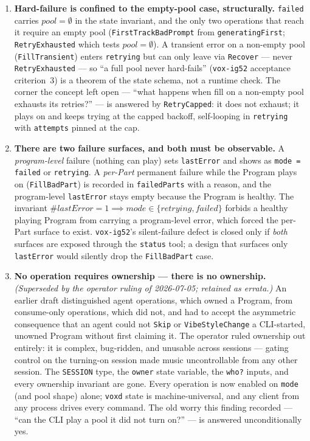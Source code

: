 \documentclass[a4paper,10pt,fleqn]{article}
\begin{document}
\begin{enumerate}
  \item \textbf{Hard-failure is confined to the empty-pool case, structurally.}
    \texttt{failed} carries $pool = \emptyset$ in the state invariant, and the
    only two operations that reach it require an empty pool
    (\texttt{FirstTrackBadPrompt} from \texttt{generatingFirst};
    \texttt{RetryExhausted} which tests $pool = \emptyset$). A transient error
    on a non-empty pool (\texttt{FillTransient}) enters \texttt{retrying} but can
    only leave via \texttt{Recover} --- never \texttt{RetryExhausted} --- so
    ``a full pool never hard-fails'' (\texttt{vox-ig52} acceptance criterion~3)
    is a theorem of the state schema, not a runtime check. The corner the
    concept left open --- ``what happens when fill on a non-empty pool exhausts
    its retries?'' --- is answered by \texttt{RetryCapped}: it does not exhaust;
    it plays on and keeps trying at the capped backoff, self-looping in
    \texttt{retrying} with \texttt{attempts} pinned at the cap.

  \item \textbf{There are two failure surfaces, and both must be observable.}
    A \emph{program-level} failure (nothing can play) sets \texttt{lastError}
    and shows as \texttt{mode = failed} or \texttt{retrying}. A \emph{per-Part}
    permanent failure while the Program plays on (\texttt{FillBadPart}) is
    recorded in \texttt{failedParts} with a reason, and the program-level
    \texttt{lastError} stays empty because the Program is healthy. The
    invariant $\# lastError = 1 \implies mode \in \{retrying, failed\}$ forbids a
    healthy playing Program from carrying a program-level error, which forced
    the per-Part surface to exist. \texttt{vox-ig52}'s silent-failure defect is
    closed only if \emph{both} surfaces are exposed through the \texttt{status}
    tool; a design that surfaces only \texttt{lastError} would silently drop the
    \texttt{FillBadPart} case.

  \item \textbf{No operation requires ownership --- there is no ownership.}
    \emph{(Superseded by the operator ruling of 2026-07-05; retained as errata.)}
    An earlier draft distinguished agent operations, which owned a Program, from
    consume-only operations, which did not, and had to accept the asymmetric
    consequence that an agent could not \texttt{Skip} or \texttt{VibeStyleChange}
    a CLI-started, unowned Program without first claiming it. The operator ruled
    ownership out entirely: it is complex, bug-ridden, and unusable across
    sessions --- gating control on the turning-on session made music
    uncontrollable from any other session. The \texttt{SESSION} type, the
    \texttt{owner} state variable, the \texttt{who?} inputs, and every ownership
    invariant are gone. Every operation is now enabled on \texttt{mode} (and
    pool shape) alone; \texttt{voxd} state is machine-universal, and any client
    from any process drives every command. The old worry this finding recorded
    --- ``can the CLI play a pool it did not turn on?'' --- is answered
    unconditionally yes.


\end{enumerate}
\end{document}
